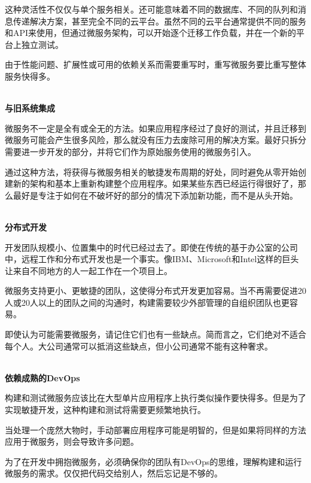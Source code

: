 这种灵活性不仅仅与单个服务相关。还可能意味着不同的数据库、不同的队列和消息传递解决方案，甚至完全不同的云平台。虽然不同的云平台通常提供不同的服务和API来使用，但通过微服务架构，可以开始逐个迁移工作负载，并在一个新的平台上独立测试。

由于性能问题、扩展性或可用的依赖关系而需要重写时，重写微服务要比重写整体服务快得多。

\hspace*{\fill} \\ %
\noindent
\textbf{与旧系统集成}

微服务不一定是全有或全无的方法。如果应用程序经过了良好的测试，并且迁移到微服务可能会产生很多风险，那么就没有压力去废除可用的解决方案。最好只拆分需要进一步开发的部分，并将它们作为原始服务使用的微服务引入。

通过这种方法，将获得与微服务相关的敏捷发布周期的好处，同时避免从零开始创建新的架构和基本上重新构建整个应用程序。如果某些东西已经运行得很好了，那么最好是专注于如何在不破坏好的部分的情况下添加新功能，而不是从头开始。

\hspace*{\fill} \\ %
\noindent
\textbf{分布式开发}

开发团队规模小、位置集中的时代已经过去了。即使在传统的基于办公室的公司中，远程工作和分布式开发也是一个事实。像IBM、Microsoft和Intel这样的巨头让来自不同地方的人一起工作在一个项目上。

微服务支持更小、更敏捷的团队，这使得分布式开发更加容易。当不再需要促进20人或20人以上的团队之间的沟通时，构建需要较少外部管理的自组织团队也更容易。


即使认为可能需要微服务，请记住它们也有一些缺点。简而言之，它们绝对不适合每个人。大公司通常可以抵消这些缺点，但小公司通常不能有这种奢求。

\hspace*{\fill} \\ %
\noindent
\textbf{依赖成熟的DevOps}

构建和测试微服务应该比在大型单片应用程序上执行类似操作要快得多。但是为了实现敏捷开发，这种构建和测试将需要更频繁地执行。 

当处理一个庞然大物时，手动部署应用程序可能是明智的，但是如果将同样的方法应用于微服务，则会导致许多问题。

为了在开发中拥抱微服务，必须确保你的团队有DevOps的思维，理解构建和运行微服务的需求。仅仅把代码交给别人，然后忘记是不够的。

